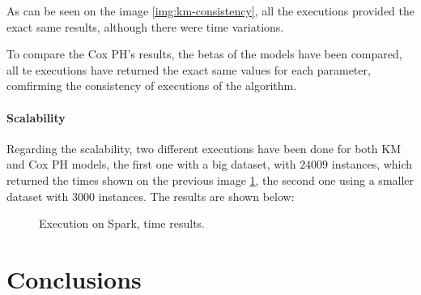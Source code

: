 \documentclass[11pt]{book} %
\begin{document}
        As can be seen on the image \ref{img:km-consistency}, all the executions provided the exact same results, although there were time variations.

        To compare the Cox PH's results, the betas of the models have been compared, all te executions have returned the exact same values for each parameter, comfirming the consistency of executions of the algorithm.

\newpage

      \subsubsection{Scalability}

        Regarding the scalability, two different executions have been done for both KM and Cox PH models, the first one with a big dataset, with $24009$ instances, which returned the times shown on the previous image \ref{img:time-comparison-km-cox}, the second one using a smaller dataset with $3000$ instances. The results are shown below:

        \begin{figure}[!ht]
          \hfill
          \caption{Execution on Spark, time results.}
          \label{img:time-comparison-km-cox}
        \end{figure}

\chapter{Conclusions}
  \label{sec:conclusions}
\end{document}
